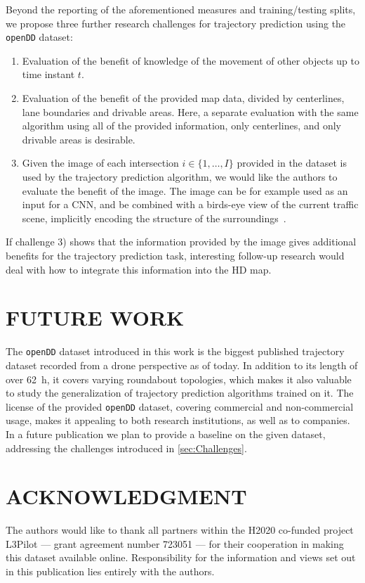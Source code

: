 \documentclass[a4paper, 10pt, conference]{ieeeconf}      %
\begin{document}
Beyond the reporting of the aforementioned measures and training/testing splits, we propose three further research challenges for trajectory prediction using the \texttt{openDD} dataset:
\begin{enumerate}
  \item Evaluation of the benefit of knowledge of the movement of other objects up to time instant $t$.
  \item Evaluation of the benefit of the provided map data, divided by centerlines, lane boundaries and drivable areas.
    Here, a separate evaluation with the same algorithm using all of the provided information, only centerlines, and only drivable areas is desirable.
  \item Given the image of each intersection $i \in \{1,\dots,I\}$ provided in the dataset is used by the trajectory prediction algorithm, we would like the authors to evaluate the benefit of the image.
    The image can be for example used as an input for a \gls{CNN}, and be combined with a birds-eye view of the current traffic scene, implicitly encoding the structure of the surroundings~\cite{breuer_analysis_2019}.
\end{enumerate}
If challenge 3) shows that the information provided by the image gives additional benefits for the trajectory prediction task, interesting follow-up research would deal with how to integrate this information into the HD map.


\section{FUTURE WORK} \label{sec:futureWork}
The \texttt{openDD} dataset introduced in this work is the biggest published trajectory dataset recorded from a drone perspective as of today.
In addition to its length of over \SI{62}{\hour}, it covers varying roundabout topologies, which makes it also valuable to study the generalization of trajectory prediction algorithms trained on it.
The license of the provided \texttt{openDD} dataset, covering commercial and non-commercial usage, makes it appealing to both research institutions, as well as to companies.
In a future publication we plan to provide a baseline on the given dataset, addressing the challenges introduced in \autoref{sec:Challenges}.


\section{ACKNOWLEDGMENT}
The authors would like to thank all partners within the H2020 co-funded project L3Pilot --- grant agreement number 723051 --- for their cooperation in making this dataset available online.
Responsibility for the information and views set out in this publication lies entirely with the authors.
\end{document}

